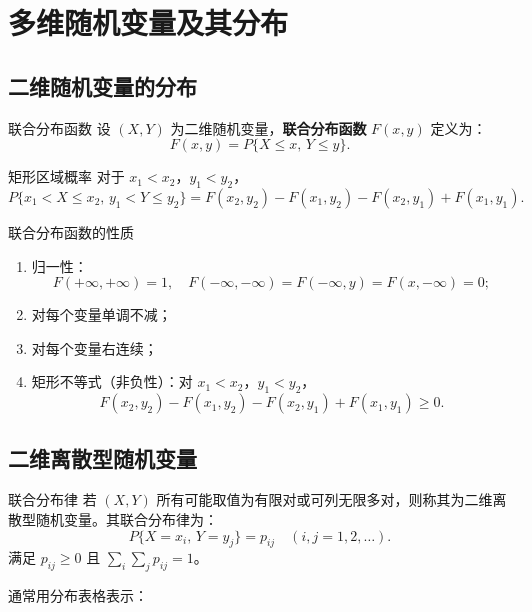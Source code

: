 \chapter{多维随机变量及其分布}


\section{二维随机变量的分布}

\begin{mydefinition}{联合分布函数}
	设 $(X, Y)$ 为二维随机变量，\textbf{联合分布函数} $F(x, y)$ 定义为：
	\[F(x, y) = P\{X \leq x,\, Y \leq y\}.\]
\end{mydefinition}

\begin{myproperty}{矩形区域概率}
对于 $x_1 < x_2$，$y_1 < y_2$，
\[P\{x_1 < X \leq x_2,\, y_1 < Y \leq y_2\} = F(x_2, y_2) - F(x_1, y_2) - F(x_2, y_1) + F(x_1, y_1).\]
\end{myproperty}

\begin{myproperty}{联合分布函数的性质}
\begin{enumerate}
	\item 归一性：
	\[F(+\infty, +\infty) = 1,\quad F(-\infty, -\infty) = F(-\infty, y) = F(x, -\infty) = 0;\]
	\item 对每个变量单调不减；
	\item 对每个变量右连续；
	\item 矩形不等式（非负性）：对 $x_1 < x_2$，$y_1 < y_2$，
	\[F(x_2, y_2) - F(x_1, y_2) - F(x_2, y_1) + F(x_1, y_1) \geq 0.\]
\end{enumerate}
\end{myproperty}

\section{二维离散型随机变量}

\begin{mydefinition}{联合分布律}
	若 $(X, Y)$ 所有可能取值为有限对或可列无限多对，则称其为二维离散型随机变量。其联合分布律为：
	\[P\{X = x_i,\, Y = y_j\} = p_{ij}\quad (i, j = 1, 2, \ldots).\]
	满足 $p_{ij} \geq 0$ 且 $\sum_{i}\sum_{j} p_{ij} = 1$。
\end{mydefinition}

通常用分布表格表示：

